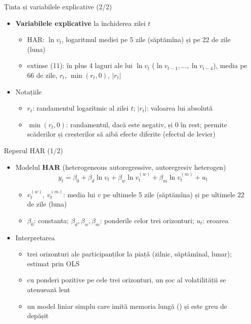 \begin{frame}{Ținta și variabilele explicative (2/2)}
\itemsize{\small}
\begin{itemize}
    \item \textbf{Variabilele explicative} la închiderea zilei $t$
    \begin{itemize}
        \item HAR: $\ln v_t$, logaritmul mediei pe 5 zile (săptămîna) și pe 22 de zile (luna)
        \item extinse (11): în plus 4 laguri ale lui $\ln v_t$ ($\ln v_{t-1}, \dots, \ln v_{t-4}$), media pe 66 de zile, $r_t$, $\min(r_t, 0)$, $|r_t|$
    \end{itemize}
    \item Notațiile
    \begin{itemize}
        \item $r_t$: randamentul logaritmic al zilei $t$; $|r_t|$: valoarea lui absolută
        \item $\min(r_t, 0)$: randamentul, dacă este negativ, și 0 în rest; permite scăderilor și creșterilor să aibă efecte diferite (efectul de levier)
    \end{itemize}
\end{itemize}
\end{frame}

\begin{frame}{Reperul HAR (1/2)}
\itemsize{\small}
\begin{itemize}
    \item Modelul \textbf{HAR} (heterogeneous autoregressive, autoregresiv heterogen)  \[ y_t = \beta_0 + \beta_d\ln v_t + \beta_w\ln v_t^{(w)} + \beta_m\ln v_t^{(m)} + u_t \]
    \begin{itemize}
        \item $v_t^{(w)}$, $v_t^{(m)}$: media lui $v$ pe ultimele 5 zile (săptămîna) și pe ultimele 22 de zile (luna)
        \item $\beta_0$: constanta; $\beta_d, \beta_w, \beta_m$: ponderile celor trei orizonturi; $u_t$: eroarea
    \end{itemize}
    \item Interpretarea
    \begin{itemize}
        \item trei orizonturi ale participanților la piață (zilnic, săptămînal, lunar); estimat prin OLS
        \item cu ponderi pozitive pe cele trei orizonturi, un șoc al volatilității se atenuează lent
        \item un model liniar simplu care imită memoria lungă () și este greu de depășit
    \end{itemize}
\end{itemize}
\end{frame}

